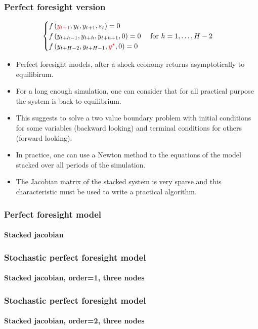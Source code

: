 \documentclass{beamer}
\begin{document}
\begin{frame}
  \frametitle{Perfect foresight version}

  \[
    \begin{cases}
      f\left( {\color{red}y_{t-1}},y_t,y_{t+1},\varepsilon_t \right) = 0\\
      f\left( y_{t+h-1},y_{t+h},y_{t+h+1}, 0 \right) = 0\quad \text{ for }h=1,\ldots,H-2\\
      f\left( y_{t+H-2},y_{t+H-1},{\color{red}y^{\star}}, 0 \right) = 0\\
    \end{cases}
  \]

  
  \begin{itemize}
  \item Perfect foresight models, after a shock economy returns asymptotically
    to equilibirum.
  \item For a long enough simulation, one can consider that for all
    practical purpose the system is back to equilibrium.
  \item This suggests to solve a two value boundary problem with
    initial conditions for some variables (backward looking) and
    terminal conditions for others (forward looking).
  \item In practice, one can use a Newton method to the equations of
    the model stacked over all periods of the simulation.
  \item The Jacobian matrix of the stacked system is very sparse and
    this characteristic must be used to write a practical algorithm.  
  \end{itemize}

\end{frame}


\begin{frame}
  \frametitle{Perfect foresight model}
  \framesubtitle{Stacked jacobian}
  \begin{center}
    \scalebox{.5}{
  }
  \end{center}
\end{frame}


\begin{frame}
  \frametitle{Stochastic perfect foresight model}
  \framesubtitle{Stacked jacobian, order=1, three nodes}
  \begin{center}
    \scalebox{.5}{
  }
  \end{center}
  \end{frame}


  \begin{frame}
    \frametitle{Stochastic perfect foresight model}
    \framesubtitle{Stacked jacobian, order=2, three nodes}
  \begin{center}
    \scalebox{.5}{
  }
  \end{center}

\end{frame}
\end{document}
